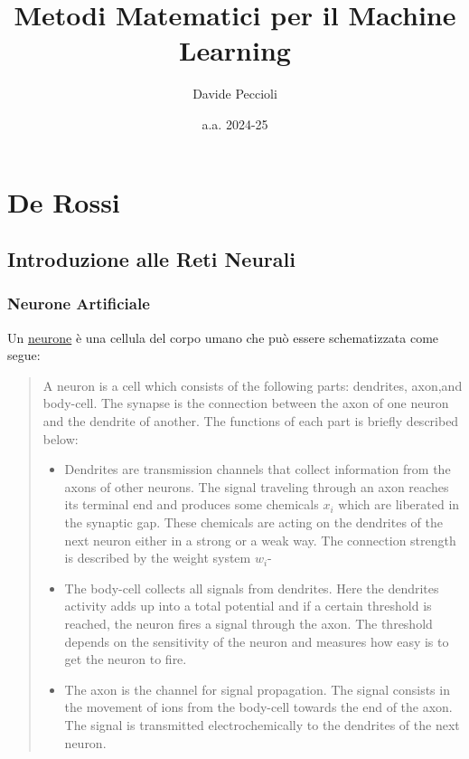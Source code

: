 \documentclass[10pt]{book}
\author{Davide Peccioli}
\date{a.a. 2024-25}
\title{Metodi Matematici per il Machine Learning}
\newcommand{\1}{\mathds{1}}
\theoremstyle{definition}%
\theoremstyle{plain}
\theoremstyle{remark}
\begin{document}
\maketitle
\tableofcontents

\part{De Rossi}
\chapter{Introduzione alle Reti Neurali}
\label{sec:org603d3a6}

\section{Neurone Artificiale}
\label{sec:org779563c}
Un \uline{neurone} è una cellula del corpo umano che può essere schematizzata come segue:
\begin{quote}
A neuron is a cell which consists of the following parts: dendrites, axon,and body-cell. The synapse is the connection between the axon of one neuron and the dendrite of another. The functions of each part is briefly described below:
\begin{itemize}
\item Dendrites are transmission channels that collect information from the axons of other neurons. The signal traveling through an axon reaches its terminal end and produces some chemicals \(x_{i}\) which are liberated in the synaptic gap. These chemicals are acting on the dendrites of the next neuron either in a strong or a weak way. The connection strength is described by the weight system \(w_{i}\)-
\item The body-cell collects all signals from dendrites. Here the dendrites activity adds up into a total potential and if a certain threshold is reached, the neuron fires a signal through the axon. The threshold depends on the sensitivity of the neuron and measures how easy is to get the neuron to fire.
\item The axon is the channel for signal propagation. The signal consists in the movement of ions from the body-cell towards the end of the axon. The signal is transmitted electrochemically to the dendrites of the next neuron.
\end{itemize}
\end{quote}
\end{document}
